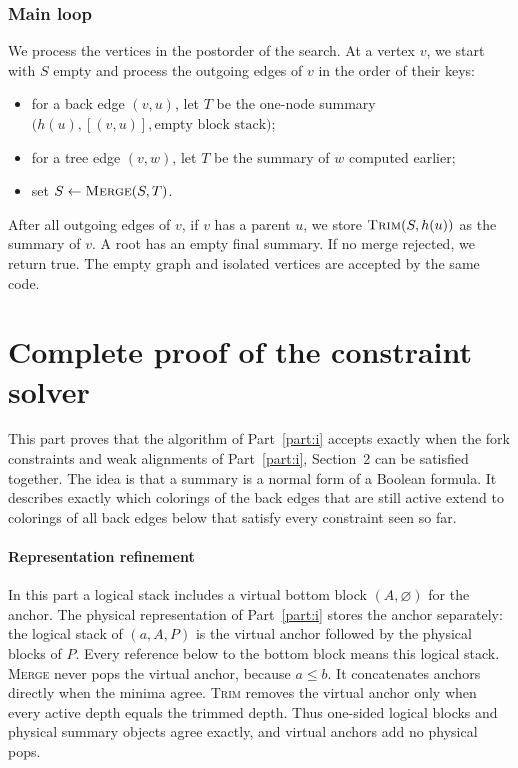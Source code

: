 \documentclass[11pt]{article}
\newcommand{\pr}[1]{\textsc{#1}}
\begin{document}
\section{Main loop}

We process the vertices in the postorder of the search. At a vertex $v$, we
start with $S$ empty and process the outgoing edges of $v$ in the order of
their keys:
\begin{itemize}[nosep]
\item for a back edge $(v,u)$, let $T$ be the one-node summary
$\bigl(h(u),[(v,u)],\text{empty block stack}\bigr)$;
\item for a tree edge $(v,w)$, let $T$ be the summary of $w$ computed earlier;
\item set $S\gets\pr{Merge}(S,T)$.
\end{itemize}
After all outgoing edges of $v$, if $v$ has a parent $u$, we store
$\pr{Trim}(S,h(u))$ as the summary of $v$. A root has an empty final summary.
If no merge rejected, we return true. The empty graph and isolated vertices
are accepted by the same code.

\part{Complete proof of the constraint solver}\label{part:ii}

This part proves that the algorithm of Part~\ref{part:i} accepts exactly when
the fork constraints and weak alignments of Part~\ref{part:i}, Section~2 can be
satisfied together. The idea is that a summary is a normal form of a Boolean
formula. It describes exactly which colorings of the back edges that are still
active extend to colorings of all back edges below that satisfy every
constraint seen so far.

\subsection*{Representation refinement}

In this part a logical stack includes a virtual bottom block $(A,\varnothing)$
for the anchor. The physical representation of Part~\ref{part:i} stores the
anchor separately: the logical stack of $(a,A,P)$ is the virtual anchor
followed by the physical blocks of $P$. Every reference below to the bottom
block means this logical stack. \pr{Merge} never pops the virtual anchor,
because $a\le b$. It concatenates anchors directly when the minima agree.
\pr{Trim} removes the virtual anchor only when every active depth equals the
trimmed depth. Thus one-sided logical blocks and physical summary objects agree
exactly, and virtual anchors add no physical pops.
\end{document}
